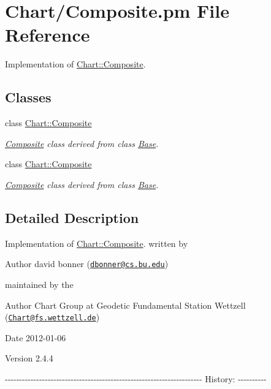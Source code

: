 \hypertarget{Composite_8pm}{
\section{Chart/Composite.pm File Reference}
\label{Composite_8pm}
}


Implementation of \hyperlink{classChart_1_1Composite}{Chart::Composite}.  


\subsection*{Classes}
\begin{DoxyCompactItemize}
\item 
class \hyperlink{classChart_1_1Composite}{Chart::Composite}
\begin{DoxyCompactList}\small\item\em \hyperlink{classChart_1_1Composite}{Composite} class derived from class \hyperlink{classChart_1_1Base}{Base}. \item\end{DoxyCompactList}\item 
class \hyperlink{classChart_1_1Composite}{Chart::Composite}
\begin{DoxyCompactList}\small\item\em \hyperlink{classChart_1_1Composite}{Composite} class derived from class \hyperlink{classChart_1_1Base}{Base}. \item\end{DoxyCompactList}\end{DoxyCompactItemize}


\subsection{Detailed Description}
Implementation of \hyperlink{classChart_1_1Composite}{Chart::Composite}. written by \begin{DoxyAuthor}{Author}
david bonner (\href{mailto:dbonner@cs.bu.edu}{\tt dbonner@cs.bu.edu})
\end{DoxyAuthor}
maintained by the \begin{DoxyAuthor}{Author}
Chart Group at Geodetic Fundamental Station Wettzell (\href{mailto:Chart@fs.wettzell.de}{\tt Chart@fs.wettzell.de}) 
\end{DoxyAuthor}
\begin{DoxyDate}{Date}
2012-\/01-\/06 
\end{DoxyDate}
\begin{DoxyVersion}{Version}
2.4.4
\end{DoxyVersion}
-\/-\/-\/-\/-\/-\/-\/-\/-\/-\/-\/-\/-\/-\/-\/-\/-\/-\/-\/-\/-\/-\/-\/-\/-\/-\/-\/-\/-\/-\/-\/-\/-\/-\/-\/-\/-\/-\/-\/-\/-\/-\/-\/-\/-\/-\/-\/-\/-\/-\/-\/-\/-\/-\/-\/-\/-\/-\/-\/-\/-\/-\/-\/-\/-\/-\/-\/-\/-\/ History: -\/-\/-\/-\/-\/-\/-\/-\/-\/-\/ 
